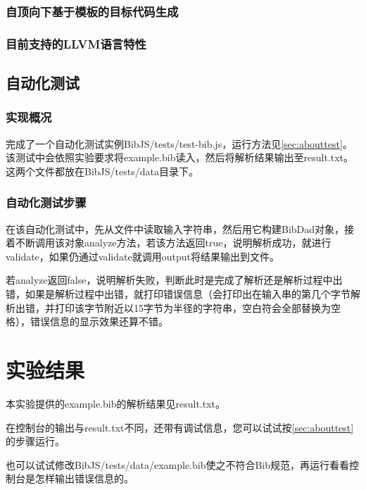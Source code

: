 \documentclass[a4paper]{article}
\begin{document}
\begin{CJK*}{UTF8}{gbsn}
    \subsubsection{自顶向下基于模板的目标代码生成}

    \subsubsection{目前支持的LLVM语言特性}

    \subsection{自动化测试}
    \subsubsection{实现概况}
    完成了一个自动化测试实例BibJS/tests/test-bib.js，运行方法见\ref{sec:abouttest}。该测试中会依照实验要求将example.bib读入，然后将解析结果输出至result.txt。这两个文件都放在BibJS/tests/data目录下。

    \subsubsection{自动化测试步骤}
    在该自动化测试中，先从文件中读取输入字符串，然后用它构建BibDad对象，接着不断调用该对象analyze方法，若该方法返回true，说明解析成功，就进行validate，如果仍通过validate就调用output将结果输出到文件。
    \par 若analyze返回false，说明解析失败，判断此时是完成了解析还是解析过程中出错，如果是解析过程中出错，就打印错误信息（会打印出在输入串的第几个字节解析出错，并打印该字节附近以15字节为半径的字符串，空白符会全部替换为空格），错误信息的显示效果还算不错。

    \section{实验结果}
    本实验提供的example.bib的解析结果见result.txt。
    \par 在控制台的输出与result.txt不同，还带有调试信息，您可以试试按\ref{sec:abouttest}的步骤运行。
    \par 也可以试试修改BibJS/tests/data/example.bib使之不符合Bib规范，再运行看看控制台是怎样输出错误信息的。

\clearpage
\end{CJK*}
\end{document}
